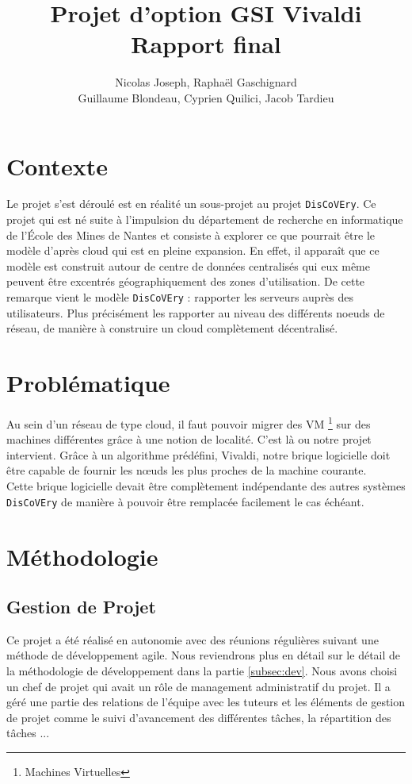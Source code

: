 \documentclass[11pt,a4paper]{article}
\title{Projet d'option GSI Vivaldi \\ Rapport final}
\author{Nicolas Joseph, Raphaël Gaschignard\\ Guillaume Blondeau, Cyprien Quilici, Jacob Tardieu}
\begin{document}
\maketitle
\section{Contexte}

Le projet s'est déroulé est en réalité un sous-projet au projet \texttt{DisCoVEry}. Ce projet qui est né suite à l’impulsion du département de recherche en informatique de l'École des Mines de Nantes et consiste à explorer ce que pourrait être le modèle d’après cloud qui est en pleine expansion. En effet, il apparaît que ce modèle est construit autour de centre de données centralisés qui eux même peuvent être excentrés géographiquement des zones d’utilisation. De cette remarque vient  le modèle \texttt{DisCoVEry} : rapporter les serveurs auprès des utilisateurs. Plus précisément les rapporter au niveau des différents noeuds de réseau, de manière à construire un cloud complètement décentralisé.

\section{Problématique}
Au sein d'un réseau de type cloud, il faut pouvoir migrer des VM \footnote{Machines Virtuelles} sur des machines différentes grâce à une notion de localité. C'est là ou notre projet intervient. Grâce à un algorithme prédéfini, Vivaldi, notre brique logicielle doit être capable de fournir les n\oe uds les plus proches de la machine courante.\\

Cette brique logicielle devait être complètement indépendante des autres systèmes \texttt{DisCoVEry} de manière à pouvoir être remplacée facilement le cas échéant.

\section{Méthodologie}
\subsection{Gestion de Projet}
Ce projet a été réalisé en autonomie avec des réunions régulières suivant une méthode de développement agile. Nous reviendrons plus en détail sur le détail de la méthodologie de développement dans la partie \ref{subsec:dev}. Nous avons choisi un chef de projet qui avait un rôle de management administratif du projet. Il a géré une partie des relations de l'équipe avec les tuteurs et les éléments de gestion de projet comme le suivi d'avancement des différentes tâches, la répartition des tâches ...\\
\end{document}
